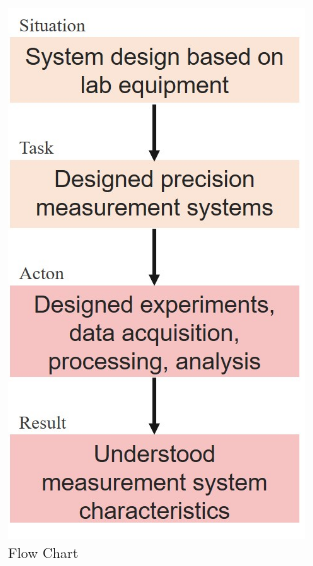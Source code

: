 \documentclass[10pt, letterpaper]{article}
\begin{document}
    \begin{figure}[htbp] %
        \begin{minipage}[c]{0.33\linewidth}
            \centering
            \includegraphics[width=0.7\textwidth]{fig/Numerical Analysis/Numerical flow chart.jpg}
            \caption{Flow Chart}
        \end{minipage}%
        \begin{minipage}[c]{0.33\linewidth}
            \centering

\end{minipage}
\end{figure}
\end{document}
